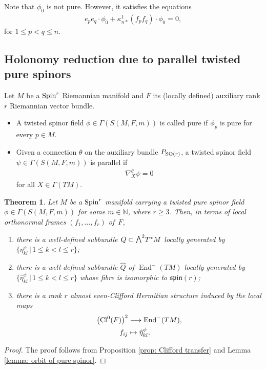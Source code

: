 \documentclass[10pt,a4paper]{amsart}
\newcommand{\ext}{\raise1pt\hbox{\small$\bigwedge$}}
\numberwithin{equation}{section}
\newtheorem{Theorem}{Theorem}[section]
\begin{document}
Note that $\phi_0$ is not pure. However, it satisfies the equations
\begin{gather*}
e_pe_q\cdot\phi_0 + \kappa_{n*}^1(f_pf_q)\cdot\phi_0 =0,
\end{gather*}
for $1\leq p<q\leq n$.

\subsection{Holonomy reduction due to parallel twisted pure spinors}

\begin{Definition}Let $M$ be a ${\rm Spin}^r$ Riemannian manifold and $F$ its (locally defined) auxiliary rank $r$ Riemannian vector bundle.
\begin{itemize}\itemsep=0pt
 \item A twisted spinor field $\phi\in\Gamma(S(M,F,m))$ is called pure if $\phi_p$ is pure for every $p\in M$.
 \item Given a connection $\theta$ on the auxiliary bundle $P_{{\rm SO}(r)}$, a twisted spinor field $\psi\in\Gamma(S(M,F,\allowbreak m))$ is parallel if
 \begin{gather*}\nabla_X^\theta\psi=0\end{gather*}
 for all $X\in\Gamma(TM)$.
\end{itemize}
\end{Definition}

\begin{Theorem} Let $M$ be a ${\rm Spin}^{r}$ manifold carrying a twisted pure spinor field $\phi\in\Gamma(S(M,F,\allowbreak m))$ for some $m\in\mathbb{N}$, where $r\geq 3$. Then, in terms of local orthonormal frames $(f_1,\dots,f_r)$ of~$F$,
 \begin{enumerate}\itemsep=0pt
 \item[$1)$] there is a well-defined subbundle $Q\subset \ext^2T^*M$ locally generated by $\{\eta_{kl}^\phi\, |\, 1\leq k<l\leq r\}$;
 \item[$2)$] there is a well-defined subbundle $\hat Q$ of $\operatorname{End}^-(TM)$ locally generated by $\{\hat\eta_{kl}^\phi\, |\, 1\leq k<l\leq r\}$ whose fibre is isomorphic to $\mathfrak{spin}(r)$;
 \item[$3)$] there is a rank $r$ almost even-Clifford Hermitian structure induced by the local maps
\begin{align*}
\big({\rm Cl}^0(F)\big)^2 &\longrightarrow \operatorname{End}^-(TM),\\
 f_{ij}&\mapsto \hat\eta_{kl}^\phi.
\end{align*}
 \end{enumerate}
\end{Theorem}
\begin{proof}The proof follows from Proposition \ref{prop: Clifford transfer} and Lemma \ref{lemma: orbit of pure spinor}.\end{proof}
\end{document}
